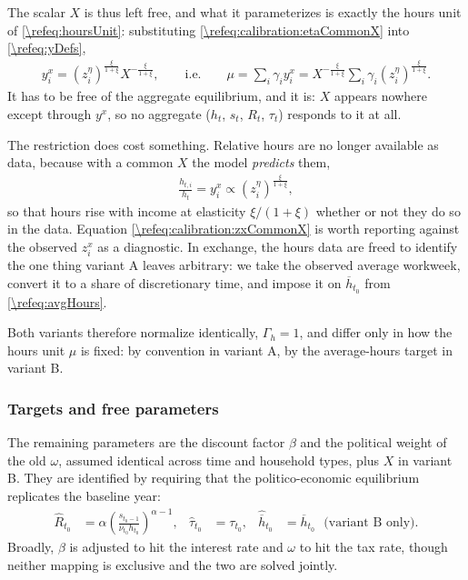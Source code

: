 The scalar $X$ is thus left free, and what it parameterizes is exactly the hours unit of \eqref{\refeq:hoursUnit}: substituting \eqref{\refeq:calibration:etaCommonX} into \eqref{\refeq:yDefs},
\begin{align}\label{\refeq:calibration:yxCommonX}
    y_i^{x} = \left(z_i^{\eta}\right)^{\frac{\xi}{1+\xi}}X^{-\frac{\xi}{1+\xi}}, \qquad\text{i.e.}\qquad \mu = \sum_i\gamma_iy_i^x = X^{-\frac{\xi}{1+\xi}}\sum_i\gamma_i\left(z_i^{\eta}\right)^{\frac{\xi}{1+\xi}}.
\end{align}
It has to be free of the aggregate equilibrium, and it is: $X$ appears nowhere except through $y^x$, so no aggregate ($h_t$, $s_t$, $R_t$, $\tau_t$) responds to it at all.

The restriction does cost something. Relative hours are no longer available as data, because with a common $X$ the model \emph{predicts} them,
\begin{align}\label{\refeq:calibration:zxCommonX}
    \frac{h_{t,i}}{h_t} = y_i^x \propto \left(z_i^{\eta}\right)^{\frac{\xi}{1+\xi}},
\end{align}
so that hours rise with income at elasticity $\xi/(1+\xi)$ whether or not they do so in the data. Equation \eqref{\refeq:calibration:zxCommonX} is worth reporting against the observed $z_i^x$ as a diagnostic. In exchange, the hours data are freed to identify the one thing variant A leaves arbitrary: we take the observed average workweek, convert it to a share of discretionary time, and impose it on $\overline{h}_{t_0}$ from \eqref{\refeq:avgHours}.

Both variants therefore normalize identically, $\Gamma_h = 1$, and differ only in how the hours unit $\mu$ is fixed: by convention in variant A, by the average-hours target in variant B.


\subsubsection{Targets and free parameters}\label{\refsec:calibration:targets}
The remaining parameters are the discount factor $\beta$ and the political weight of the old $\omega$, assumed identical across time and household types, plus $X$ in variant B. They are identified by requiring that the politico-economic equilibrium replicates the baseline year:
\begin{align}\label{\refeq:calibration:system}
    \hat{R}_{t_0} &= \alpha\left(\frac{s_{t_0-1}}{\nu_{t_0}h_{t_0}}\right)^{\alpha-1}, &
    \hat{\tau}_{t_0} &= \tau_{t_0}, &
    \hat{\overline{h}}_{t_0} &= \overline{h}_{t_0}\mbox{ }\text{(variant B only)}.
\end{align}
Broadly, $\beta$ is adjusted to hit the interest rate and $\omega$ to hit the tax rate, though neither mapping is exclusive and the two are solved jointly.

